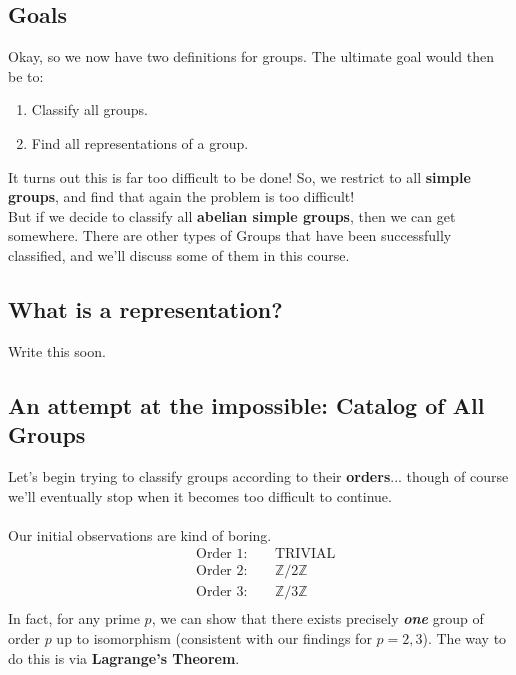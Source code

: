 \documentclass[11pt]{article}
\begin{document}
\subsection{Goals}
Okay, so we now have two definitions for groups. The ultimate goal would then be to:
\begin{enumerate}[label=(\alph*)]
  \item Classify all groups.
  \item Find all representations of a group.
\end{enumerate}
It turns out this is far too difficult to be done! So, we restrict to all \textbf{simple groups}, and find that again the problem is too difficult!
\\
But if we decide to classify all \textbf{abelian simple groups}, then we can get somewhere. There are other types of Groups that have been successfully classified, and we'll discuss some of them in this course.

\subsection{What is a representation?}
Write this soon.

\subsection{An attempt at the impossible: Catalog of All Groups}
Let's begin trying to classify groups according to their \textbf{orders}... though of course we'll eventually stop when it becomes too difficult to continue. 
\\
\\
Our initial observations are kind of boring.
\begin{align*}
  &\text{Order 1: } \;\;\;&\text{TRIVIAL} \\
  &\text{Order 2: } \;\;\;&\mathbb{Z}/2\mathbb{Z} \\
  &\text{Order 3: } \;\;\;&\mathbb{Z}/3\mathbb{Z} \\
\end{align*} In fact, for any prime $p$, we can show that there exists precisely \textbf{\textit{one}} group of order $p$ up to isomorphism (consistent with our findings for $p = 2,3$). The way to do this is via \textbf{Lagrange's Theorem}.




\newpage
\vskip 0.5cm
\end{document}
